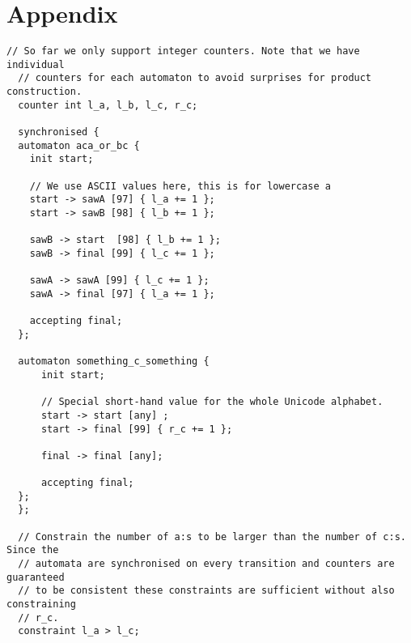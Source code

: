 \documentclass[acmsmall,review,anonymous,screen]{acmart}\settopmatter{printfolios=true,printccs=false,printacmref=true}
\theoremstyle{definition}
\begin{document}



\appendix
\section{Appendix}

\begin{lstlisting}[caption={An example input file for \Catra{} for the problem introduced in \cref{sec:introduction:motivation}, illustrating every major syntax element. From beginning to end: synchronised (product) automata using the keyword \texttt{synchronised} (automata A and B), labels (except those with ranges), register increments, and constraints on the final values of their counters.}, label=lst:input-example]
  // So far we only support integer counters. Note that we have individual
  // counters for each automaton to avoid surprises for product construction.
  counter int l_a, l_b, l_c, r_c;

  synchronised {
  automaton aca_or_bc {
    init start;
  
    // We use ASCII values here, this is for lowercase a
    start -> sawA [97] { l_a += 1 };
    start -> sawB [98] { l_b += 1 };
  
    sawB -> start  [98] { l_b += 1 };
    sawB -> final [99] { l_c += 1 };
  
    sawA -> sawA [99] { l_c += 1 };
    sawA -> final [97] { l_a += 1 };
  
    accepting final;
  };
  
  automaton something_c_something {
      init start;
  
      // Special short-hand value for the whole Unicode alphabet.
      start -> start [any] ;
      start -> final [99] { r_c += 1 };
  
      final -> final [any];
  
      accepting final;
  };
  };
  
  // Constrain the number of a:s to be larger than the number of c:s. Since the
  // automata are synchronised on every transition and counters are guaranteed
  // to be consistent these constraints are sufficient without also constraining
  // r_c.
  constraint l_a > l_c;
\end{lstlisting}

\end{document}
